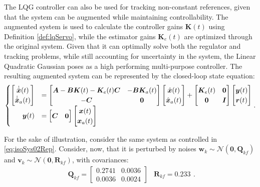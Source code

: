 \documentclass[a4paper,11pt]{book}
\numberwithin{figure}{chapter}
\numberwithin{equation}{chapter}
\numberwithin{table}{chapter}
\theoremstyle{definition}
\begin{document}
The LQG controller can also be used for tracking non-constant references, given that the system can be augmented while maintaining controllability. The augmented system is used to calculate the controller gains $\bm{K}(t)$ using Definition \ref{def:lqServo}, while the estimator gains $\bm{K}_e(t)$ are optimized through the original system. Given that it can optimally solve both the regulator and tracking problems, while still accounting for uncertainty in the system, the Linear Quadratic Gaussian poses as a high performing multi-purpose controller. The resulting augmented system can be represented by the closed-loop state equation:
\begin{align}
\begin{cases}
        \begin{bmatrix}
            \dot{\hat{\bm{x}}}(t) \\
            \dot{\hat{\bm{x}}}_a(t)
        \end{bmatrix} &= \begin{bmatrix}
            \bm{A} - \bm{B} \bm{K}(t) - \bm{K}_e(t) \bm{C} & -\bm{B} \bm{K}_a(t) \\ - \bm{C} & \bm{0}
        \end{bmatrix} \begin{bmatrix}
            \hat{\bm{x}}(t) \\
            \hat{\bm{x}}_a(t)
        \end{bmatrix} + \begin{bmatrix}
            \bm{K}_e(t) & \bm{0}  \\
            \bm{0} & \bm{I} 
        \end{bmatrix} \begin{bmatrix}
	        \bm{y}(t) \\ \bm{r}(t)
        \end{bmatrix} \\
        \hfill \bm{y}(t) &= \begin{bmatrix}
            \bm{C} & \bm{0}
        \end{bmatrix} \begin{bmatrix}
            \bm{x}(t) \\
            \bm{x}_a(t)
        \end{bmatrix}
    \end{cases}
.\end{align}

For the sake of illustration, consider the same system as controlled in \eqref{eq:isoSys02Rep}. Consider, now, that it is perturbed by noises $\bm{w}_k \sim \mathcal{N}(\bm{0}, \bm{Q}_{kf})$ and $\bm{v}_k \sim \mathcal{N}(\bm{0}, \bm{R}_{kf})$, with covariances:
\begin{equation}
	\begin{matrix}
		\bm{Q}_{kf} = \begin{bmatrix}
			0.2741  &  0.0036 \\
		    0.0036  &  0.0024
		\end{bmatrix} & \bm{R}_{kf} = 0.233
	\end{matrix}
.\end{equation}
\end{document}
